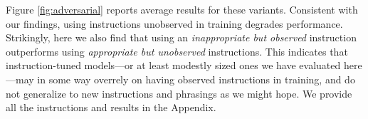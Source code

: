 Figure \ref{fig:adversarial} reports average results for these variants.
Consistent with our findings, using instructions unobserved in training degrades performance.
Strikingly, here we also find that using an \emph{inappropriate but observed} instruction outperforms using \emph{appropriate but unobserved} instructions.
This indicates that instruction-tuned models---or at least modestly sized ones we have evaluated here---may in some way overrely on having observed instructions in training, and do not generalize to new instructions and phrasings as we might hope. We provide all the instructions and results in the Appendix.





\begin{comment}
\begin{table}[h]
  \centering
  \begin{tabular}{l c}
    \toprule
    Settings             & \textbf{Avg. Acc.} \\ [0.5ex]
    \hline
    Task Designer        & 45.2               \\
    Unobserved           & 44.1               \\
    \hline
    Observed - Correct   & \textbf{50.5}      \\
    Observed - Incorrect & 47.2               \\
    Observed - Negated   & 43.7               \\
    \hline
    Random Text          & 35.9               \\
    \bottomrule
  \end{tabular}
  \caption{Results on 7 Datasets from \textsc{Big-Bench} with different instruction settings.}
  \label{tab:my_label}
\end{table}
\end{comment}


